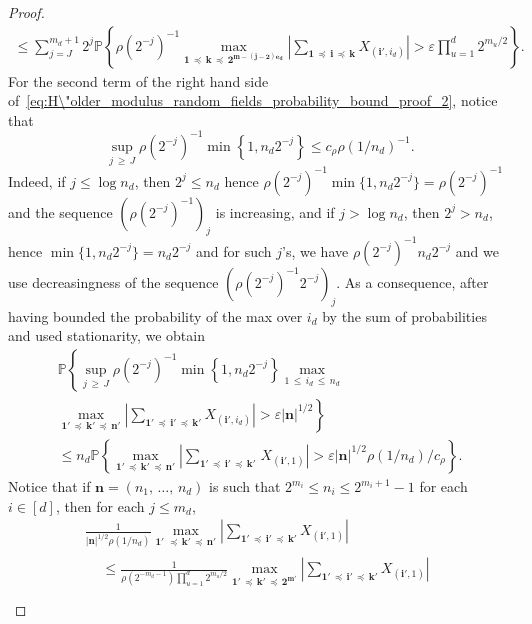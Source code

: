 \documentclass[AHL,Unicode,longabstracts,published]{cedram}
\newcommand\PP{\mathbb{P}}
\newcommand\abs[1]{|#1|}
\newcommand{\pr}[1]{(#1)}
\newcommand\eps{\varepsilon}
\newcommand{\gr}[1]{\bm{#1}}
\newcommand{\grn}{\bm{n}}
\newcommand{\grm}{\bm{m}}
\newcommand{\imd}{\preccurlyeq}
\begin{document}
\begin{proof}
\begin{multline}
\leq \sum_{j=J}^{m_d+1}2^j
\PP\left\{\rho\left(2^{-j}\right)^{-1}
\max_{\gr{1}\,\imd\,\gr{k}\,\imd\,\gr{2^{\grm-
\pr{j-2}\gr{e_d}}} }
\left|
\sum_{\gr{1}\,\imd\,\gr{i}\,\imd\,\gr{k}} X_{\left(\gr{i'},i_d\right) } \right|>\eps \prod_{u=1}^d 2^{m_u/2} \right\}.
\end{multline}
For the second term of the right hand side of~\eqref{eq:H\"older_modulus_random_fields_probability_bound_proof_2}, notice that
\begin{equation}
\sup_{j\,\geqslant\,J}\rho\left(2^{-j}\right)^{-1}\min\left\{1,n_d2^{-j}\right\}\leq c_\rho
\rho\pr{1/n_d}^{-1}.
\end{equation}
Indeed, if $j\leq \log n_d$, then $2^j\leq n_d$ hence $\rho\pr{2^{-j}}^{-1}\min\{1,n_d2^{-j}\}=\rho\pr{2^{-j}}^{-1}$ and the sequence $\pr{\rho\pr{2^{-j}}^{-1}}_j$ is increasing, and if $j>\log n_d$, then $2^j>n_d$, hence $\min\{1,n_d2^{-j}\}=n_d2^{-j}$ and for such $j$'s, we have $\rho\pr{2^{-j}}^{-1}n_d2^{-j}$ and we use decreasingness of the sequence $\pr{\rho\pr{2^{-j}}^{-1}2^{-j}}_j$. As a consequence, after having bounded the probability of the max over $i_d$ by the sum of probabilities and used stationarity, we obtain
\begin{multline}
\PP\left\{\sup_{j\,\geqslant\,J}\rho\left(2^{-j}\right)^{-1}
\min\left\{1,n_d2^{-j}\right\}\max_{1\,\leq\,i_d\,\leq\, n_d}\right.\\
\left.\max_{\gr{1'}\,\imd\,\gr{k'}\,\imd\,\gr{n'}} \left|
\sum_{\gr{1'}\,\imd\,\gr{i'}\,\imd\,\gr{k'}} X_{\left(\gr{i'},i_d\right) }\right|>\eps\abs{\grn}^{1/2}\right\}\\
\leq n_d
\PP\left\{ \max_{\gr{1'}\,\imd\,\gr{k'}\,\imd\,\gr{n'}} \left|
\sum_{\gr{1'}\,\imd\,\gr{i'}\,\imd\,\gr{k'}\,} X_{\left(\gr{i'},1\right)}\right|>\eps\abs{\grn}^{1/2}\rho\pr{1/n_d} /c_{\rho}\right\}.
\end{multline}
Notice that if $\grn =\pr{n_1,\,\dots,\,n_d}$ is such that $2^{m_i}\leq n_i\leq 2^{m_i+1}-1$ for each $i\in [d]$, then for each $j\leq m_d$,
\begin{multline*}
\frac{1}{\abs{\grn}^{1/2}\rho\pr{1/n_d}}\max_{\gr{1'}\,\,\imd\,\gr{k'}\,\imd\,\gr{n'}}
\left|
\sum_{\gr{1'}\,\imd\,\gr{i'}\,\imd\,\gr{k'}} X_{\left(\gr{i'},1\right)}\right|\\
\begin{aligned}
&\leq
\frac{1}{\rho\left(2^{-m_{d}-1}\right)\prod_{u=1}^d2^{m_u/2}}
\max_{\gr{1'}\,\imd\,\gr{k'}\,\imd
\,\gr{2^{m'}}}\left|\sum_{\gr{1'}\,\imd\,\gr{i'}\,\imd\,\gr{k'}} X_{\left(\gr{i'},1\right)}\right|\\

\end{aligned}
\end{multline*}
\end{proof}
\end{document}
